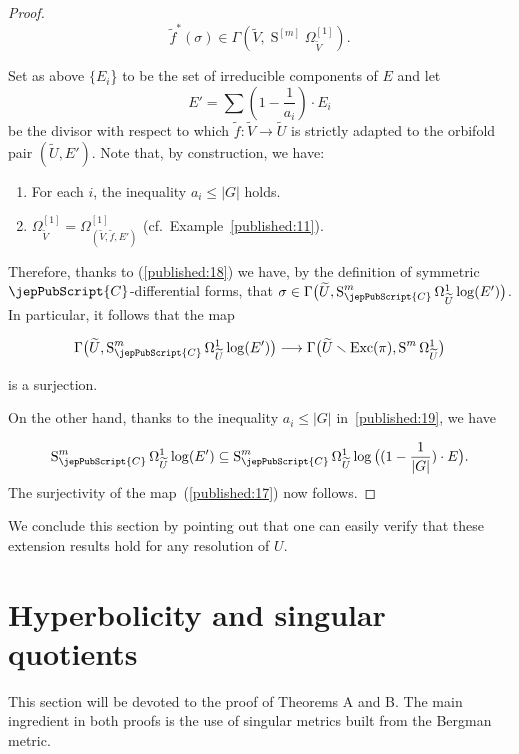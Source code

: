 \begin{proof}
  \begin{equation}\label{published:18}
   \widetilde f^*(\sigma)
   \in \Gamma(\widetilde V , \operatorname{S}^{[m]}\Omega^{[1]}_{\widetilde V}).
  \end{equation} 

Set as above $\{E_i$\} to be the set of irreducible components of $E$ and let 
$$
E' = \sum (1- \frac{1}{a_i})\cdot E_i
$$
be the divisor with respect to which $\widetilde f : \widetilde V \to \widetilde U$ is strictly adapted 
to the orbifold pair $(\widetilde U, E')$.
Note that, by construction, we have:

\begin{enumerate}
\item \label{published:19} For each $i$, the inequality $a_i \leqslant | G |$ holds. 
\item $\Omega^{[1]}_{\widetilde V} = \Omega^{[1]}_{(\widetilde V, \widetilde f, E')}$ (cf.~Example~\ref{published:11}).
\end{enumerate}

Therefore, thanks to (\ref{published:18}) we have, by the definition of symmetric $\jepPubScript{C}$-differential forms, 
that $\sigma \in \Gamma\big(\widetilde U, \operatorname{S}^m_{\jepPubScript{C}} \Omega^1_{\widetilde U} \log (E')\big)$. In 
particular, it follows that  
the map

$$
\Gamma\big(\widetilde U,  \operatorname{S}^m_{\jepPubScript{C}} \Omega^1_{\widetilde U}\log (E')   \big)     \longrightarrow  
    \Gamma \big( \widetilde U\smallsetminus \operatorname{Exc}(\pi), \operatorname{S}^m\Omega^1_{\widetilde U}    \big)$$

is a surjection.

On the other hand, thanks to the inequality $a_i \leqslant |G|$ in~\ref{published:19}, we have

$$
\operatorname{S}^m_{\jepPubScript{C}} \Omega^1_{\widetilde U}\log (E') \subseteq 
        \operatorname{S}^m_{\jepPubScript{C}} \Omega^1_{\widetilde U} \log\big(  (1- \frac{1}{|G|})\cdot E \big).
$$
 The surjectivity of the map~(\ref{published:17}) now follows. 
\end{proof}

We conclude this section by pointing out that
one can easily verify that these extension results hold for any 
resolution of $U$.

\section{Hyperbolicity and singular quotients}\label{published:20}
This section will be devoted to the proof of Theorems A and B. The main ingredient in both proofs is the use of singular metrics built from the Bergman metric.


